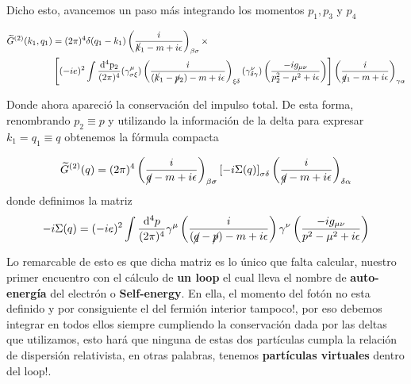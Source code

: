 \documentclass[tickz]{article}
\numberwithin{equation}{section}
\begin{document}
Dicho esto, avancemos un paso más integrando los momentos $ p_1,p_3 $ y $ p_4 $

\begin{equation}
\begin{aligned}
\widetilde{G}^{(2)}(k_{1},q_{1})&=(2\pi)^{4}\delta(q_{1}-k_{1})\left(\frac{i}{\cancel{k}_{1}-m+i\epsilon}\right)_{\beta\sigma}\times\\
&\left[(-ie)^{2}\int\frac{\mathrm{\mathrm{d^4}p_2}}{(2\pi)^{4}}(\gamma_{\sigma\xi}^{\mu})\left(\frac{i}{(\cancel{k}_{1}-\cancel{p}_2)-m+i\epsilon}\right)_{\xi\delta}(\gamma_{\delta\gamma}^{\nu})\left(\frac{-ig_{\mu\nu}}{p_2^{2}-\mu^{2}+i\epsilon}\right) \right] \left(\frac{i}{\cancel{q}_{1}-m+i\epsilon}\right)_{\gamma\alpha}
\end{aligned}
\end{equation}

Donde ahora apareció la conservación del impulso total. De esta forma,
renombrando $p_2\equiv p$ y utilizando la información de
la delta para expresar $k_{1}=q_{1}\equiv q$ obtenemos la fórmula compacta

\begin{equation}
\widetilde{G}^{(2)}(q)=(2\pi)^{4}\left(\frac{i}{\cancel{q}-m+i\epsilon}\right)_{\beta\sigma} \left[-i\Sigma(q)\right]_{\sigma \delta} \left(\frac{i}{\cancel{q}-m+i\epsilon}\right)_{\delta \alpha}
\end{equation}
donde definimos la matriz
\begin{equation}\label{autoenergiaelectron}
-i\Sigma(q)=(-ie)^{2}\int\frac{\mathrm{d^4}p}{(2\pi)^{4}}\gamma^{\mu}\left(\frac{i}{(\cancel{q}-\cancel{p})-m+i\epsilon}\right)\gamma^{\nu}\left(\frac{-ig_{\mu\nu}}{p^{2}-\mu^{2}+i\epsilon}\right)
\end{equation}

Lo remarcable de esto es que dicha matriz es lo único que falta calcular, nuestro primer encuentro con el cálculo de \textbf{un loop} el cual lleva el nombre de \textbf{auto-energía} del electrón o \textbf{Self-energy}. En ella, el momento del fotón no esta definido y por consiguiente
el del fermión interior tampoco!, por eso debemos integrar en todos
ellos siempre cumpliendo la conservación dada por las deltas que utilizamos,
esto hará que ninguna de estas dos partículas cumpla la relación de
dispersión relativista, en otras palabras, tenemos \textbf{partículas
virtuales} dentro del loop!.
\end{document}
